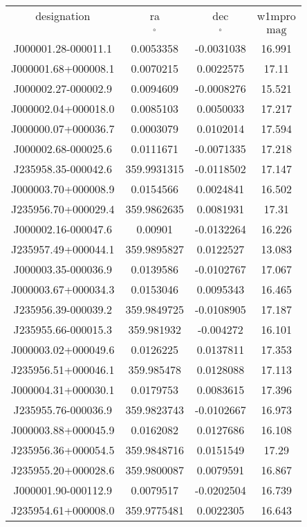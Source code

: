 \begin{table}
\begin{tabular}{cccc}
designation & ra & dec & w1mpro \\
 & $\mathrm{{}^{\circ}}$ & $\mathrm{{}^{\circ}}$ & $\mathrm{mag}$ \\
J000001.28-000011.1 & 0.0053358 & -0.0031038 & 16.991 \\
J000001.68+000008.1 & 0.0070215 & 0.0022575 & 17.11 \\
J000002.27-000002.9 & 0.0094609 & -0.0008276 & 15.521 \\
J000002.04+000018.0 & 0.0085103 & 0.0050033 & 17.217 \\
J000000.07+000036.7 & 0.0003079 & 0.0102014 & 17.594 \\
J000002.68-000025.6 & 0.0111671 & -0.0071335 & 17.218 \\
J235958.35-000042.6 & 359.9931315 & -0.0118502 & 17.147 \\
J000003.70+000008.9 & 0.0154566 & 0.0024841 & 16.502 \\
J235956.70+000029.4 & 359.9862635 & 0.0081931 & 17.31 \\
J000002.16-000047.6 & 0.00901 & -0.0132264 & 16.226 \\
J235957.49+000044.1 & 359.9895827 & 0.0122527 & 13.083 \\
J000003.35-000036.9 & 0.0139586 & -0.0102767 & 17.067 \\
J000003.67+000034.3 & 0.0153046 & 0.0095343 & 16.465 \\
J235956.39-000039.2 & 359.9849725 & -0.0108905 & 17.187 \\
J235955.66-000015.3 & 359.981932 & -0.004272 & 16.101 \\
J000003.02+000049.6 & 0.0126225 & 0.0137811 & 17.353 \\
J235956.51+000046.1 & 359.985478 & 0.0128088 & 17.113 \\
J000004.31+000030.1 & 0.0179753 & 0.0083615 & 17.396 \\
J235955.76-000036.9 & 359.9823743 & -0.0102667 & 16.973 \\
J000003.88+000045.9 & 0.0162082 & 0.0127686 & 16.108 \\
J235956.36+000054.5 & 359.9848716 & 0.0151549 & 17.29 \\
J235955.20+000028.6 & 359.9800087 & 0.0079591 & 16.867 \\
J000001.90-000112.9 & 0.0079517 & -0.0202504 & 16.739 \\
J235954.61+000008.0 & 359.9775481 & 0.0022305 & 16.643 \\

\end{tabular}
\end{table}
